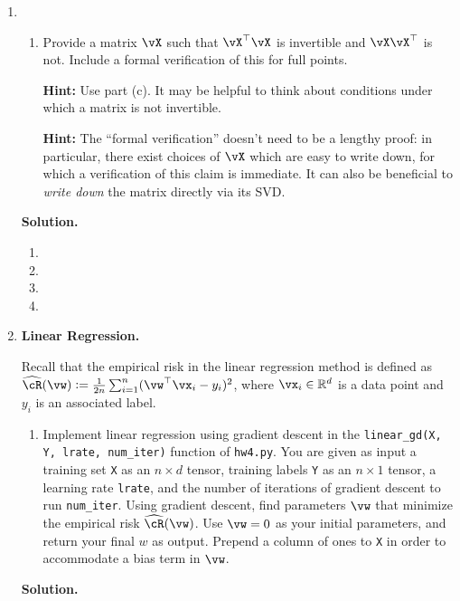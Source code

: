 \documentclass{article}
\def\R{\mathbb{R}}
\def\hcR{\widehat{\cR}}
\theoremstyle{definition}
\theoremstyle{remark}
\newenvironment{Q}
{%
  \clearpage
  \item
  }
  {%
    \phantom{s} %
    \bigskip
    \textbf{Solution.}
  }
\begin{document}
\begin{enumerate}[font={\Large\bfseries},left=0pt]
\begin{Q}
\begin{enumerate}
    \textbf{Remark:} This characterizes when linear regression has a unique solution due to the normal equation (note that we always have at least one solution obtained by the pseudoinverse). We would not have had a unique solution for part (a) if we had an $n_i = 0$.
    
    \item Provide a matrix $\vX$ such that $\vX^\top \vX$ is invertible and $\vX\vX^\top$ is not. Include a formal verification of this for full points.
    
    \textbf{Hint:} Use part (c). It may be helpful to think about conditions under which a matrix is not invertible.

    \textbf{Hint:}
    The ``formal verification'' doesn't need to be a lengthy proof: in particular, there exist choices of $\vX$ which are easy to write down,
    for which a verification of this claim is immediate.  It can also be beneficial to \emph{write down} the matrix directly via its SVD.
    
    
  \end{enumerate}
  \end{Q}
  \begin{enumerate}
    \item
    \item
    \item
    \item
  \end{enumerate}



    \begin{Q}
      \textbf{\Large Linear Regression.}

      Recall that the empirical risk in the linear regression method is defined as $\hcR(\vw) := \frac{1}{2n}\sum_{i=1}^n (\vw^\top \vx_i - y_i)^2$, where $\vx_i \in \R^d$ is a data point and $y_i$ is an associated label.
      \begin{enumerate}
        \item Implement linear regression using gradient descent in the \texttt{linear\_gd(X, Y, lrate, num\_iter)} function of \texttt{hw4.py}. You are given as input a training set \texttt{X} as an $n \times d$ tensor, training labels \texttt{Y} as an $n \times 1$ tensor, a learning rate \texttt{lrate}, and the number of iterations of gradient descent to run \texttt{num\_iter}.  Using gradient descent, find parameters $\vw$ that minimize the empirical risk $\hcR(\vw)$. Use $\vw = 0$ as your initial parameters, and return your final $w$ as output. Prepend a column of ones to \texttt{X} in order to accommodate a bias term in $\vw$.


\end{enumerate}
\end{Q}
\end{enumerate}
\end{document}
